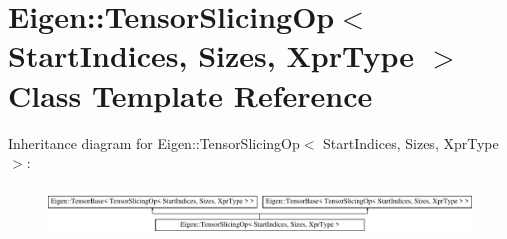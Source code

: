 \hypertarget{class_eigen_1_1_tensor_slicing_op}{}\section{Eigen\+:\+:Tensor\+Slicing\+Op$<$ Start\+Indices, Sizes, Xpr\+Type $>$ Class Template Reference}
\label{class_eigen_1_1_tensor_slicing_op}
Inheritance diagram for Eigen\+:\+:Tensor\+Slicing\+Op$<$ Start\+Indices, Sizes, Xpr\+Type $>$\+:\begin{figure}[H]
\begin{center}
\leavevmode
\includegraphics[height=1.302326cm]{class_eigen_1_1_tensor_slicing_op}
\end{center}
\end{figure}
